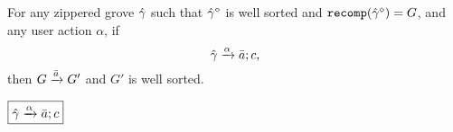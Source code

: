\begin{theorem}[Sensibility]
  For any zippered grove $\Z{\Grove}$
  such that $\erase{\Z{\Grove}}$ is well sorted
    and $\recomp{\erase{\Z{\Grove}}} = G$,
  and any user action $\alpha$,
  if
  \[
    \applyAction{\Z{\Grove}}{\alpha}{\Q{a}}{c},
  \]
  then $G \action{\Q{a}} G'$ and $G'$ is well sorted.
\end{theorem}

\noindent $\boxed{\applyAction{ \Z{\Grove} }{ \alpha }{ \Q{a} }{ c }}$
%
\begin{mathpar}


\end{mathpar}

